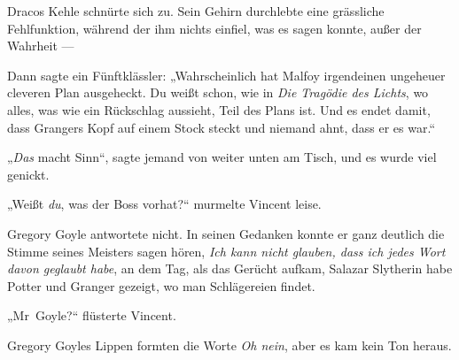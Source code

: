 Dracos Kehle schnürte sich zu. Sein Gehirn durchlebte eine grässliche Fehlfunktion, während der ihm nichts einfiel, was es sagen konnte, außer der Wahrheit —

Dann sagte ein Fünftklässler:
„Wahrscheinlich hat Malfoy irgendeinen ungeheuer cleveren Plan ausgeheckt. Du weißt schon, wie in \emph{Die Tragödie des Lichts}, wo alles, was wie ein Rückschlag aussieht, Teil des Plans ist. Und es endet damit, dass Grangers Kopf auf einem Stock steckt und niemand ahnt, dass er es war.“

„\emph{Das} macht Sinn“, sagte jemand von weiter unten am Tisch, und es wurde viel genickt.

\later

„Weißt \emph{du}, was der Boss vorhat?“ murmelte Vincent leise.

Gregory Goyle antwortete nicht. In seinen Gedanken konnte er ganz deutlich die Stimme seines Meisters sagen hören, \emph{Ich kann nicht glauben, dass ich jedes Wort davon geglaubt habe}, an dem Tag, als das Gerücht aufkam, Salazar Slytherin habe Potter und Granger gezeigt, wo man Schlägereien findet.

„Mr~Goyle?“ flüsterte Vincent.

Gregory Goyles Lippen formten die Worte \emph{Oh nein}, aber es kam kein Ton heraus.

\later

